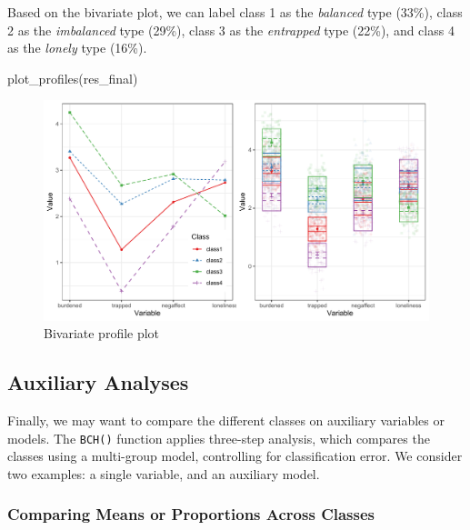 \documentclass[
  man,floatsintext]{apa6}
\newenvironment{Shaded}{\begin{snugshade}}{\end{snugshade}}
\newcommand{\FunctionTok}[1]{\textcolor[rgb]{0.00,0.00,0.00}{#1}}
\newcommand{\NormalTok}[1]{#1}
\begin{document}
Based on the bivariate plot, we can label class 1 as the \emph{balanced} type (33\%), class 2 as the \emph{imbalanced} type (29\%), class 3 as the \emph{entrapped} type (22\%), and class 4 as the \emph{lonely} type (16\%).

\begin{Shaded}
\begin{Highlighting}[]
\FunctionTok{plot\_profiles}\NormalTok{(res\_final)}
\end{Highlighting}
\end{Shaded}

\begin{figure}
\includegraphics[width=1\linewidth]{appendices/lpa_profiles} \caption{Bivariate profile plot}\label{fig:unnamed-chunk-19}
\end{figure}

\hypertarget{auxiliary-analyses}{%
\subsection{Auxiliary Analyses}\label{auxiliary-analyses}}

Finally, we may want to compare the different classes on auxiliary variables or models.
The \texttt{BCH()} function applies three-step analysis, which compares the classes using a multi-group model, controlling for classification error.
We consider two examples: a single variable, and an auxiliary model.

\hypertarget{comparing-means-or-proportions-across-classes}{%
\subsubsection{Comparing Means or Proportions Across Classes}\label{comparing-means-or-proportions-across-classes}}
\end{document}
